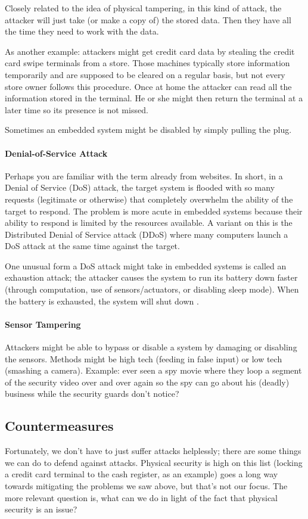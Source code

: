 Closely related to the idea of physical tampering, in this kind of attack, the attacker will just take (or make a copy of) the stored data. Then they have all the time they need to work with the data.

As another example: attackers might get credit card data by stealing the credit card swipe terminals from a store. Those machines typically store information temporarily and are supposed to be cleared on a regular basis, but not every store owner follows this procedure. Once at home the attacker can read all the information stored in the terminal. He or she might then return the terminal at a later time so its presence is not missed.

Sometimes an embedded system might be disabled by simply pulling the plug. 

\paragraph{Denial-of-Service Attack}
Perhaps you are familiar with the term already from websites. In short, in a Denial of Service (DoS) attack, the target system is flooded with so many requests (legitimate or otherwise) that completely overwhelm the ability of the target to respond. The problem is more acute in embedded systems because their ability to respond is limited by the resources available. A variant on this is the Distributed Denial of Service attack (DDoS) where many computers launch a DoS attack at the same time against the target.

One unusual form a DoS attack might take in embedded systems is called an exhaustion attack; the attacker causes the system to run its battery down faster (through computation, use of sensors/actuators, or disabling sleep mode). When the battery is exhausted, the system will shut down \cite{ess}.

\paragraph{Sensor Tampering}
Attackers might be able to bypass or disable a system by damaging or disabling the sensors.  Methods might be high tech (feeding in false input) or low tech (smashing a camera). Example: ever seen a spy movie where they loop a segment of the security video over and over again so the spy can go about his (deadly) business while the security guards don't notice?


\subsection*{Countermeasures}
Fortunately, we don't have to just suffer attacks helplessly; there are some things we can do to defend against attacks. Physical security is high on this list (locking a credit card terminal to the cash register, as an example) goes a long way towards mitigating the problems we saw above, but that's not our focus. The more relevant question is, what can we do in light of the fact that physical security is an issue?

